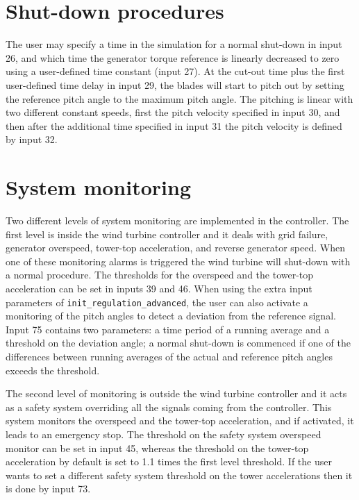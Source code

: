 \section{Shut-down procedures} \label{s:cutout}

The user may specify a time in the simulation for a normal shut-down in input 26, and which time the generator torque reference is linearly decreased to zero using a user-defined time constant (input 27). At the cut-out time plus the first user-defined time delay in input 29, the blades will start to pitch out by setting the reference pitch angle to the maximum pitch angle. The pitching is linear with two different constant speeds, first the pitch velocity specified in input 30, and then after the additional time specified in input 31 the pitch velocity is defined by input 32.

\section{System monitoring}

Two different levels of system monitoring are implemented in the controller. The first level is inside the wind turbine controller and it deals with grid failure, generator overspeed, tower-top acceleration, and reverse generator speed. When one of these monitoring alarms is triggered the wind turbine will shut-down with a normal procedure. The thresholds for the overspeed and the tower-top acceleration can be set in inputs 39 and 46. When using the extra input parameters of \verb|init_regulation_advanced|, the user can also activate a monitoring of the pitch angles to detect a deviation from the reference signal. Input 75 contains two parameters: a time period of a running average and a threshold on the deviation angle; a normal shut-down is commenced if one of the differences between running averages of the actual and reference pitch angles exceeds the threshold.

The second level of monitoring is outside the wind turbine controller and it acts as a safety system overriding all the signals coming from the controller. This system monitors the overspeed and the tower-top acceleration, and if activated, it leads to an emergency stop. The threshold on the safety system overspeed monitor can be set in input 45, whereas the threshold on the tower-top acceleration by default is set to 1.1 times the first level threshold. If the user wants to set a different safety system threshold on the tower accelerations then it is done by input 73.

